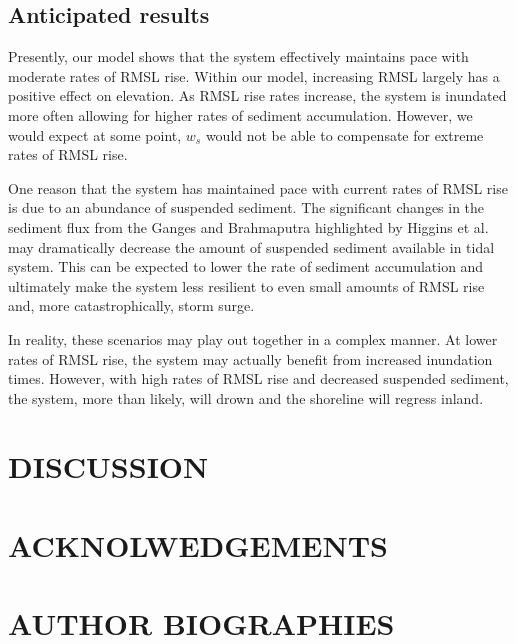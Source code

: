 \documentclass{wscpaperproc}
\theoremstyle{wsc}
\begin{document}
\subsection{Anticipated results}

Presently, our model shows that the system effectively maintains pace with moderate rates of RMSL rise. Within our model, increasing RMSL largely has a positive effect on elevation. As RMSL rise rates increase, the system is inundated more often allowing for higher rates of sediment accumulation. However, we would expect at some point, $w_s$ would not be able to compensate for extreme rates of RMSL rise.

One reason that the system has maintained pace with current rates of RMSL rise is due to an abundance of suspended sediment. The significant changes in the sediment flux from the Ganges and Brahmaputra highlighted by Higgins et al. \cite{higginsRiverLinkingIndia2018} may dramatically decrease the amount of suspended sediment available in tidal system. This can be expected to lower the rate of sediment accumulation and ultimately make the system less resilient to even small amounts of RMSL rise and, more catastrophically, storm surge.

In reality, these scenarios may play out together in a complex manner. At lower rates of RMSL rise, the system may actually benefit from increased inundation times. However, with high rates of RMSL rise and decreased suspended sediment, the system, more than likely, will drown and the shoreline will regress inland.

\section{DISCUSSION}



\section*{ACKNOLWEDGEMENTS}

\footnotesize





\section*{AUTHOR BIOGRAPHIES}
\end{document}
